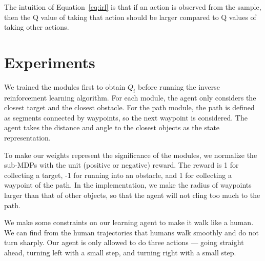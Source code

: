 The intuition of Equation~\ref{eq:irl} is that if an action is observed from the
sample, then the Q value of taking that action should be larger compared to Q
values of taking other actions.

\section{Experiments}
\label{sec:exp}

We trained the modules first to obtain $Q_i$ before running the inverse reinforcement
learning algorithm. For each module, the agent only considers the closest target
and the closest obstacle. For the path module, the path is defined as segments
connected by waypoints, so the next waypoint is considered. The agent takes the
distance and angle to the closest objects as the state representation.

To make our weights represent the significance of the modules, we
normalize the sub-MDPs with the unit (positive or negative) reward. The reward
is 1 for collecting a target, -1 for running into an obstacle, and 1 for
collecting a waypoint of the path. In the implementation, we make the radius of
waypoints larger than that of other objects, so that the agent will not cling
too much to the path.

We make some constraints on our learning agent to make it walk like a human.
We can find from the human trajectories that humans walk smoothly and do not turn
sharply.  Our agent is only allowed to do three actions --- going straight ahead,
turning left with a small step, and turning right with a small step.

